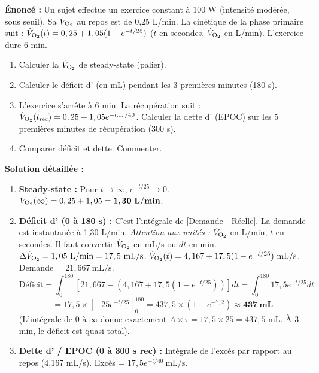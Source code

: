 \documentclass[11pt]{article}
\begin{document}
\begin{exoresolu}
    \textbf{Énoncé :} Un sujet effectue un exercice constant à 100 W (intensité modérée, sous seuil). Sa $\dot{V}_{\ce{O2}}$ au repos est de 0,25 L/min. La cinétique de la phase primaire suit : $\dot{V}_{\ce{O2}}(t) = 0,25 + 1,05 (1 - e^{-t/25})$ ($t$ en secondes, $\dot{V}_{\ce{O2}}$ en L/min). L'exercice dure 6 min.
    \begin{enumerate}
        \item Calculer la $\dot{V}_{\ce{O2}}$ de steady-state (palier).
        \item Calculer le déficit d' (en mL) pendant les 3 premières minutes (180 s).
        \item L'exercice s'arrête à 6 min. La récupération suit : $\dot{V}_{\ce{O2}}(t_{\text{rec}}) = 0,25 + 1,05 e^{-t_{\text{rec}}/40}$. Calculer la dette d' (EPOC) sur les 5 premières minutes de récupération (300 s).
        \item Comparer déficit et dette. Commenter.
    \end{enumerate}
    \tcblower
    \textbf{Solution détaillée :}
    \begin{enumerate}
        \item \textbf{Steady-state :} Pour $t \to \infty$, $e^{-t/25} \to 0$.
              $\dot{V}_{\ce{O2}}(\infty) = 0,25 + 1,05 = \mathbf{1,30\ L/min}$.
        \item \textbf{Déficit d' (0 à 180 s) :} C'est l'intégrale de [Demande - Réelle]. La demande est instantanée à 1,30 L/min.
              \emph{Attention aux unités :} $\dot{V}_{\ce{O2}}$ en L/min, $t$ en secondes. Il faut convertir $\dot{V}_{\ce{O2}}$ en mL/s ou $dt$ en min.
              $\Delta \dot{V}_{\ce{O2}} = 1,05\ \text{L/min} = 17,5\ \text{mL/s}$.
              $\dot{V}_{\ce{O2}}(t) = 4,167 + 17,5 (1 - e^{-t/25})\ \text{mL/s}$.
              Demande = $21,667\ \text{mL/s}$.
              \[ \text{Déficit} = \int_0^{180} \left[ 21,667 - \left(4,167 + 17,5(1-e^{-t/25})\right) \right] dt = \int_0^{180} 17,5 e^{-t/25} dt \]
              \[ = 17,5 \times \left[ -25 e^{-t/25} \right]_0^{180} = 437,5 \times (1 - e^{-7,2}) \approx \mathbf{437\ mL} \]
              (L'intégrale de 0 à $\infty$ donne exactement $A \times \tau = 17,5 \times 25 = 437,5$ mL. À 3 min, le déficit est quasi total).
        \item \textbf{Dette d' / EPOC (0 à 300 s rec) :} Intégrale de l'excès par rapport au repos (4,167 mL/s).
              Excès = $17,5 e^{-t/40}\ \text{mL/s}$.

\end{enumerate}
\end{exoresolu}
\end{document}
